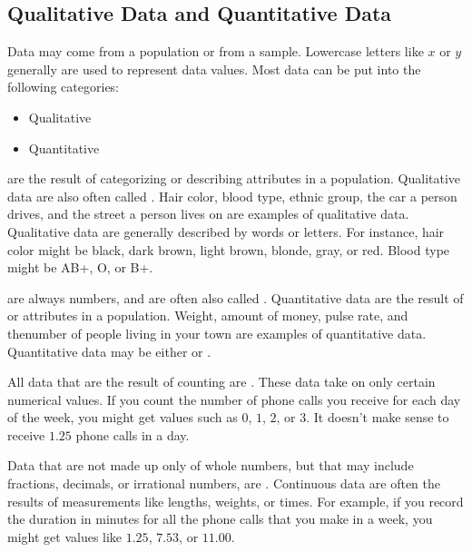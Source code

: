 \documentclass[letterpaper,10pt,english]{jupyterBook}
\begin{document}
\subsection{Qualitative Data and Quantitative Data}
\label{\detokenize{Ch1 Sampling and Data/1.2 Scales of Measurement:id1}}
\sphinxAtStartPar
Data may come from a population or from a sample. Lowercase letters like  \(x\)  or  \(y\) generally are used to represent data values. Most data can be put into the following categories:
\begin{itemize}
\item {} 
\sphinxAtStartPar
Qualitative

\item {} 
\sphinxAtStartPar
Quantitative

\end{itemize}

\sphinxAtStartPar
{} are the result of categorizing or describing attributes in a population. Qualitative data are also often called . Hair color, blood type, ethnic group, the car a person drives, and the street a person lives on are examples of qualitative data. Qualitative data are generally described by words or letters. For instance, hair color might be black, dark brown, light brown, blonde, gray, or red. Blood type might be AB+, O\sphinxhyphen{}, or B+.

\sphinxAtStartPar
{} are always numbers, and are often also called . Quantitative data are the result of  or  attributes in a population. Weight, amount of money, pulse rate, and  thenumber of people living in your town are examples of quantitative data. Quantitative data may be either  or .

\sphinxAtStartPar
All data that are the result of counting are . These data take on only certain numerical values. If you count the number of phone calls you receive for each day of the week, you might get values such as \(0\), \(1\), \(2\), or \(3\). It doesn’t make sense to receive \(1.25\) phone calls in a day.

\sphinxAtStartPar
Data that are not made up only of whole numbers, but that may include fractions, decimals, or irrational numbers, are . Continuous data are often the results of measurements like lengths, weights, or times. For example, if you record the duration in minutes for all the phone calls that you make in a week, you might get values like \(1.25\), \(7.53\), or \(11.00\).
\end{document}
